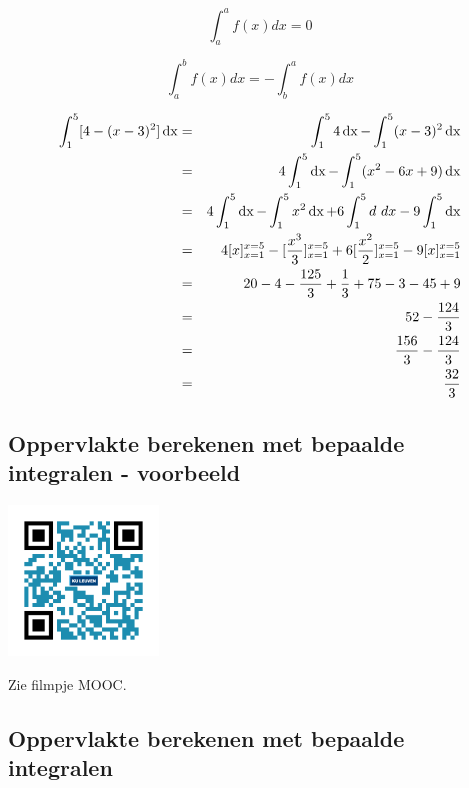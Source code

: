 \begin{rekenregel}
	\[\int^a_a f(x) dx = 0\]

\[\int^b_a f(x) dx = - \int^a_b f(x) dx\]
\end{rekenregel}

\begin{voorbeeld}
	\begin{eqnarray*}
	\int_{1}^{5} [4-(x-3)^2] \operatorname{dx} &=& \int_{1}^{5} 4 \operatorname{dx} - \int_{1}^{5} (x-3)^2 \operatorname{dx} \\
	&=& 4 \int_{1}^{5} \operatorname{dx} - \int_{1}^{5} (x^2-6x+9) \operatorname{dx} \\
	&=& 4 \int_{1}^{5} \operatorname{dx} - \int_{1}^{5} x^2 \operatorname{dx} +6 \int_{1}^{5} d\ dx - 9 \int_{1}^{5} \operatorname{dx} \\
	&=& 4[x]_{x=1}^{x=5}-[\frac{x^3}{3}]_{x=1}^{x=5}+6[\frac{x^2}{2}]_{x=1}^{x=5}-9[x]_{x=1}^{x=5} \\
	&=& 20-4-\frac{125}{3}+\frac{1}{3}+75-3-45+9 \\
	&=& 52 - \frac{124}{3} \\
	&=& \frac{156}{3} - \frac{124}{3} \\
	&=& \frac{32}{3} \\
	\end{eqnarray*}
\end{voorbeeld}


\subsection{Oppervlakte berekenen met bepaalde integralen - voorbeeld}
\begin{minipage}{.25\linewidth}
	\raggedright
	\includegraphics[width=4cm]{6_afgeleiden_integralen/inputs/QR_Code_OPPBEPINT_module6_2}
\end{minipage}
\begin{minipage}{.7\linewidth}
	Zie filmpje MOOC.
\end{minipage}


\subsection{Oppervlakte berekenen met bepaalde integralen}

